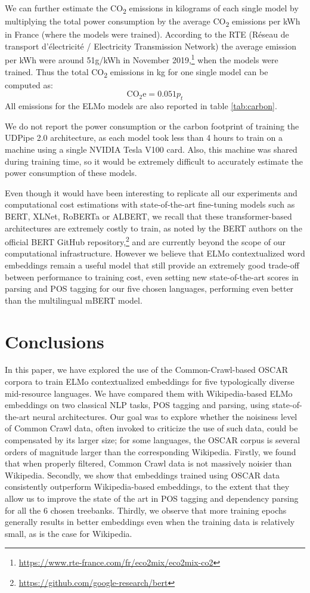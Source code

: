 We can further estimate the CO\textsubscript{2} emissions in kilograms of each single model by multiplying the total power consumption by the average CO\textsubscript{2} emissions per kWh in France (where the models were trained). According to the RTE (Réseau de transport d'électricité / Electricity Transmission Network) the average emission per kWh were around 51g/kWh in November 2019,\footnote{\url{https://www.rte-france.com/fr/eco2mix/eco2mix-co2}} when the models were trained. Thus the total CO\textsubscript{2} emissions in kg for one single model can be computed as:
\[
    \text{CO}_{2}\text{e} = 0.051 p_t
\]
All emissions for the ELMo models are also reported in table \ref{tab:carbon}.

We do not report the power consumption or the carbon footprint of training the UDPipe 2.0 architecture, as each model took less than 4 hours to train on a machine using a single NVIDIA Tesla V100 card. Also, this machine was shared during training time, so it would be extremely difficult to accurately estimate the power consumption of these models.

Even though it would have been interesting to replicate all our experiments and computational cost estimations with state-of-the-art fine-tuning models such as BERT, XLNet, RoBERTa or ALBERT, we recall that these transformer-based architectures are extremely costly to train, as noted by the BERT authors on the official BERT GitHub repository,\footnote{\url{https://github.com/google-research/bert}} and are currently beyond the scope of our computational infrastructure. However we believe that ELMo contextualized word embeddings remain a useful model that still provide an extremely good trade-off between performance to training cost, even setting new state-of-the-art scores in parsing and POS tagging for our five chosen languages, performing even better than the multilingual mBERT model.


\section{Conclusions}

In this paper, we have explored the use of the Common-Crawl-based OSCAR corpora to train ELMo contextualized embeddings for five typologically diverse mid-resource languages. We have compared them with Wikipedia-based ELMo embeddings on two classical NLP tasks, POS tagging and parsing, using state-of-the-art neural architectures. Our goal was to explore whether the noisiness level of Common Crawl data, often invoked to criticize the use of such data, could be compensated by its larger size; for some languages, the OSCAR corpus is several orders of magnitude larger than the corresponding Wikipedia. Firstly, we found that when properly filtered, Common Crawl data is not massively noisier than Wikipedia. Secondly, we show that embeddings trained using OSCAR data consistently outperform Wikipedia-based embeddings, to the extent that they allow us to improve the state of the art in POS tagging and dependency parsing for all the 6 chosen treebanks. Thirdly, we observe that more training epochs generally results in better embeddings even when the training data is relatively small, as is the case for Wikipedia.

